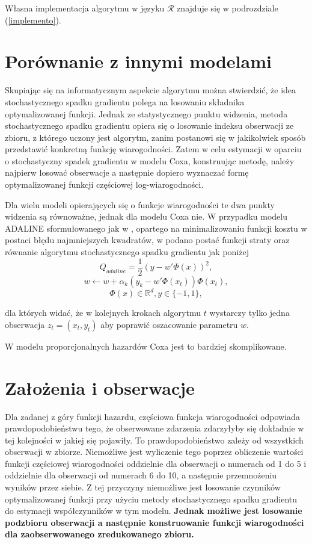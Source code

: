 Własna implementacja algorytmu w języku $\mathcal{R}$ znajduje się w podrozdziale (\ref{implemento}).

\section{Porównanie z innymi modelami}

Skupiając się na informatycznym aspekcie algorytmu można stwierdzić, że idea stochastycznego spadku gradientu polega na losowaniu składnika optymalizowanej funkcji. Jednak ze statystycznego punktu widzenia, metoda stochastycznego spadku gradientu opiera się o losowanie indeksu obserwacji ze zbioru, z którego uczony jest algorytm, zanim postanowi się w jakikolwiek sposób przedstawić konkretną funkcję wiarogodności. Zatem w celu estymacji w oparciu o stochastyczny spadek gradientu w modelu Coxa, konstruując metodę, należy najpierw losować obserwacje a następnie dopiero wyznaczać formę optymalizowanej funkcji częściowej log-wiarogodności.

Dla wielu modeli opierających się o funkcje wiarogodności te dwa punkty widzenia są równoważne, jednak dla modelu Coxa nie. W przypadku modelu ADALINE sformułowanego jak w \cite{ADALINE2}, opartego na minimalizowaniu funkcji kosztu w postaci błędu najmniejszych kwadratów, w \cite{bott2} podano postać funkcji straty oraz równanie algorytmu stochastycznego spadku gradientu jak poniżej
$$Q_{adaline} = \frac{1}{2}(y-w'\varPhi(x))^2,$$ 
$$w \leftarrow w + \alpha_k(y_k-w'\varPhi(x_t))\varPhi(x_t),$$
$$\varPhi(x) \in \mathbb{R}^d, y \in \{-1,1\},$$

dla których widać, że w kolejnych krokach algorytmu $t$ wystarczy tylko jedna obserwacja $z_t=(x_t,y_t)$ aby poprawić oszacowanie parametru $w$.

W modelu proporcjonalnych hazardów Coxa jest to bardziej skomplikowane.

\section{Założenia i obserwacje}\label{zalozenia}

Dla zadanej z góry funkcji hazardu, częściowa funkcja wiarogodności odpowiada prawdopodobieństwu tego, że obserwowane zdarzenia zdarzyłyby się dokładnie w tej kolejności w jakiej się pojawiły. To prawdopodobieństwo zależy od wszystkich obserwacji w zbiorze. Niemożliwe jest wyliczenie tego poprzez obliczenie wartości funkcji częściowej wiarogodności oddzielnie dla obserwacji o numerach od 1 do 5 i oddzielnie dla obserwacji od numerach 6 do 10, a następnie przemnożeniu wyników przez siebie. Z tej przyczyny niemożliwe jest losowanie czynników optymalizowanej funkcji przy użyciu metody stochastycznego spadku gradientu do estymacji współczynników w tym modelu. \textbf{Jednak możliwe jest losowanie podzbioru obserwacji a następnie konstruowanie funkcji wiarogodności dla zaobserwowanego zredukowanego zbioru.}

